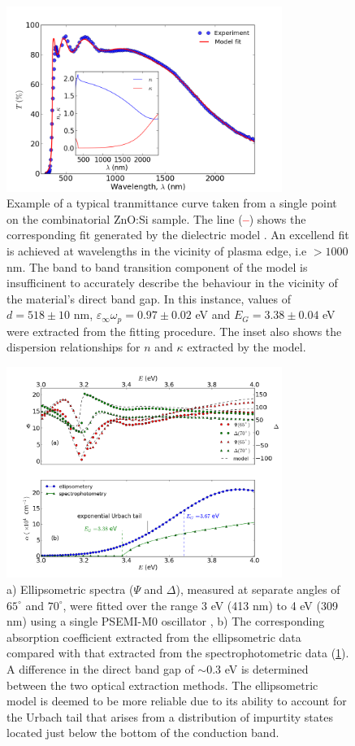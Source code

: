 \documentclass[preprint]{elsarticle}
\begin{document}
\begin{figure}[0]
\centering
\includegraphics[width = 0.8\textwidth]{figure1.png}
\caption{\label{fig:1} Example of a typical tranmittance curve taken from a single point on the combinatorial ZnO:Si sample. The line (\textcolor{red}{\textbf{--}}) shows the corresponding fit generated by the dielectric model \cite{Treharne2012}. An excellend fit is achieved at wavelengths in the vicinity of plasma edge, i.e $>1000$ nm. The band to band transition component of the model is insufficinent to accurately describe the behaviour in the vicinity of the material's direct band gap. In this instance, values of $d= 518 \pm 10$ nm, $\varepsilon_{\infty}\omega_p = 0.97 \pm 0.02$ eV and $E_{G} = 3.38 \pm 0.04$ eV were extracted from the fitting procedure. The inset also shows the dispersion relationships for $n$ and $\kappa$ extracted by the model.}
\end{figure}

\begin{figure}[p]
\centering
\includegraphics[width = 0.8\textwidth]{figure_0.png}
\caption{\label{fig:2} a) Ellipsometric spectra ($\Psi$ and $\Delta$), measured at separate angles of $65^{\circ}$ and $70^{\circ}$, were fitted over the range 3 eV (413 nm) to 4 eV (309 nm) using a single PSEMI-M0 oscillator \cite{Paulson1998, Johs1999}, b) The corresponding absorption coefficient extracted from the ellipsometric data compared with that extracted from the spectrophotometric data (\ref{fig:1}). A difference in the direct band gap of $\sim0.3$ eV is determined between the two optical extraction methods. The ellipsometric model is deemed to be more reliable due to its ability to account for the Urbach tail that arises from a distribution of impurtity states located just below the bottom of the conduction band.}
\end{figure}
\end{document}
